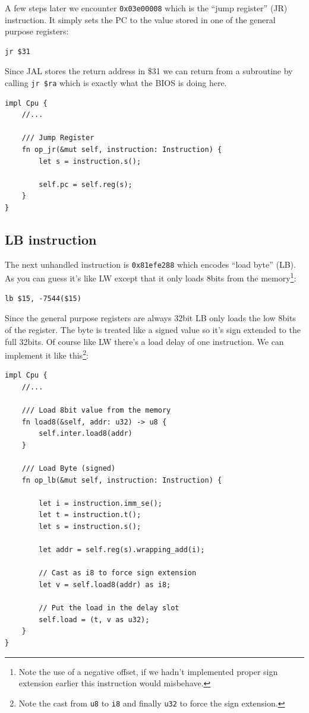 \documentclass[a4paper]{article}
\newcommand{\code}[1] {\texttt{#1}}
\begin{document}
A few steps later we encounter \code{0x03e00008} which is the ``jump
register'' (JR) instruction. It simply sets the PC to the value stored
in one of the general purpose registers:

\begin{lstlisting}[language=assembly]
jr $31
\end{lstlisting}

Since JAL stores the return address in \$31 we can return from a
subroutine by calling \code{jr \$ra} which is exactly what the BIOS
is doing here.

\begin{lstlisting}
impl Cpu {
    //...

    /// Jump Register
    fn op_jr(&mut self, instruction: Instruction) {
        let s = instruction.s();

        self.pc = self.reg(s);
    }
}
\end{lstlisting}

\subsection{LB instruction}

The next unhandled instruction is \code{0x81efe288} which encodes
``load byte'' (LB). As you can guess it's like LW except that it only
loads 8bits from the memory\footnote{Note the use of a negative
  offset, if we hadn't implemented proper sign extension earlier this
  instruction would misbehave.}:

\begin{lstlisting}[language=assembly]
lb $15, -7544($15)
\end{lstlisting}

Since the general purpose registers are always 32bit LB only loads the
low 8bits of the register. The byte is treated like a signed value so
it's sign extended to the full 32bits. Of course like LW there's a
load delay of one instruction. We can implement it like
this\footnote{Note the cast from \code{u8} to \code{i8} and finally
  \code{u32} to force the sign extension.}:

\begin{lstlisting}
impl Cpu {
    //...

    /// Load 8bit value from the memory
    fn load8(&self, addr: u32) -> u8 {
        self.inter.load8(addr)
    }

    /// Load Byte (signed)
    fn op_lb(&mut self, instruction: Instruction) {

        let i = instruction.imm_se();
        let t = instruction.t();
        let s = instruction.s();

        let addr = self.reg(s).wrapping_add(i);

        // Cast as i8 to force sign extension
        let v = self.load8(addr) as i8;

        // Put the load in the delay slot
        self.load = (t, v as u32);
    }
}
\end{lstlisting}
\end{document}
